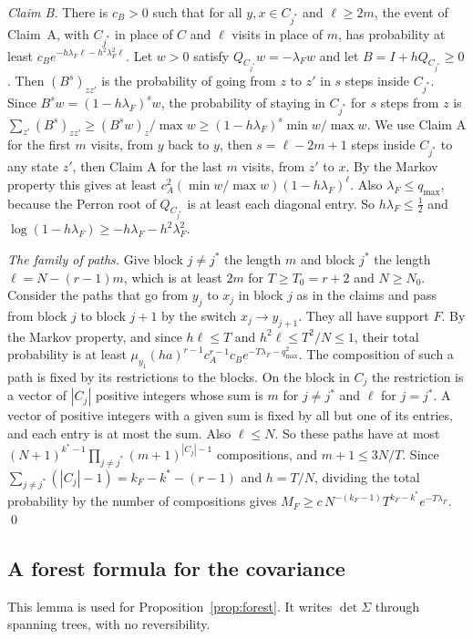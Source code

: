 \emph{Claim B.} There is $c_B>0$ such that for all $y,x\in C_{j^*}$ and
$\ell\ge2m$, the event of Claim~A, with $C_{j^*}$ in place of $C$ and $\ell$
visits in place of $m$, has probability at least $c_Be^{-h\lambda_F\ell-h^2\lambda_F^2\ell}$. Let $w>0$
satisfy $Q_{C_{j^*}}w=-\lambda_Fw$ and let $B=I+hQ_{C_{j^*}}\ge0$. Then
$(B^s)_{zz'}$ is the probability of going from $z$ to $z'$ in $s$ steps
inside $C_{j^*}$. Since $B^sw=(1-h\lambda_F)^sw$, the probability of staying
in $C_{j^*}$ for $s$ steps from $z$ is
$\sum_{z'}(B^s)_{zz'}\ge(B^sw)_z/\max w\ge(1-h\lambda_F)^s\min w/\max w$. We
use Claim A for the first $m$ visits, from $y$ back to $y$, then
$s=\ell-2m+1$ steps inside $C_{j^*}$ to any state $z'$, then Claim A for the
last $m$ visits, from $z'$ to $x$. By the Markov property this gives at least
$c_A^2(\min w/\max w)(1-h\lambda_F)^\ell$. Also $\lambda_F\le q_{\max}$,
because the Perron root of $Q_{C_{j^*}}$ is at least each diagonal entry. So
$h\lambda_F\le\frac12$ and $\log(1-h\lambda_F)\ge-h\lambda_F-h^2\lambda_F^2$.

\emph{The family of paths.} Give block $j\ne j^*$ the length $m$ and block
$j^*$ the length $\ell=N-(r-1)m$, which is at least $2m$ for $T\ge T_0=r+2$
and $N\ge N_0$. Consider the paths that go from $y_j$ to $x_j$ in block $j$
as in the claims and pass from block $j$ to block $j+1$ by the switch
$x_j\to y_{j+1}$. They all have support $F$. By the Markov property, and
since $h\ell\le T$ and $h^2\ell\le T^2/N\le1$, their total probability is at
least $\mu_{y_1}(ha)^{r-1}c_A^{r-1}c_Be^{-T\lambda_F-q_{\max}^2}$. The
composition of such a path is fixed by its restrictions to the blocks. On
the block in $C_j$ the restriction is a vector of $|C_j|$ positive integers
whose sum is $m$ for $j\ne j^*$ and $\ell$ for $j=j^*$. A vector of
positive integers with a given sum is fixed by all but one of its entries,
and each entry is at most the sum. Also $\ell\le N$. So these paths
have at most $(N+1)^{k^*-1}\prod_{j\ne j^*}(m+1)^{|C_j|-1}$ compositions,
and $m+1\le3N/T$. Since $\sum_{j\ne j^*}(|C_j|-1)=k_F-k^*-(r-1)$ and $h=T/N$,
dividing the total probability by the number of compositions gives
$M_F\ge c\,N^{-(k_F-1)}T^{k_F-k^*}e^{-T\lambda_F}$. \qed

\subsection{A forest formula for the covariance}\label{app:forest}

This lemma is used for Proposition~\ref{prop:forest}. It writes $\det\Sigma$ through
spanning trees, with no reversibility.

